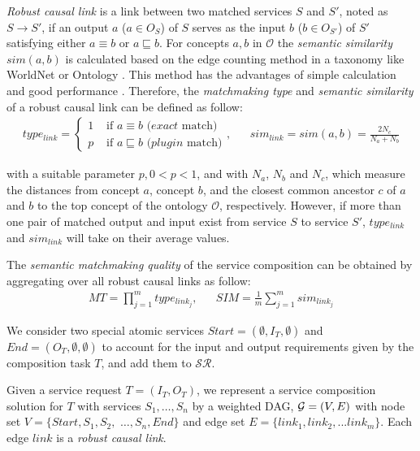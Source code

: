 \emph{Robust causal link} \cite{lecue2008optimizing} is a link between two matched services $S$ and $S'$, noted as $S \rightarrow S'$, if an output $a$ ($a \in {O_S}$) of $S$ serves as the input $b$ ($b \in {O_{S'}}$) of $S'$ satisfying either $a \equiv b$ or $a \sqsubseteq b$.  For concepts $a, b$ in $\mathcal{O}$ the \emph{semantic similarity} $sim(a, b)$ is calculated based on the edge counting method in a taxonomy like WorldNet or Ontology \cite{shet2012new}. This method has the advantages of simple calculation and good performance \cite{shet2012new}. Therefore, the \emph{matchmaking type} and \emph{semantic similarity} of a robust causal link can be defined as follow:
\begin{align}
\label{eq_link}
type_{link} = 
\begin{cases}
	1 & \text{ if $a\equiv b$ ($exact$ match)}\\
	p & \text{ if $a \sqsubseteq b$ ($plugin$ match)}
\end{cases}
,&&
sim_{link} = sim(a,b) = \frac{2N_c}{N_{a}+N_{b}}
\end{align}

\noindent with a suitable parameter $p, 0<p< 1$, and with $N_a$, $N_b$ and $N_c$, which measure the distances from concept $a$, concept $b$, and the closest common ancestor $c$ of $a$ and $b$ to the top concept of the ontology $\mathcal{O}$, respectively. However, if more than one pair of matched output and input exist from service $S$ to service $S'$, $type_{link}$ and $sim_{link}$ will take on their average values.

The \emph{semantic matchmaking quality} of the service composition can be obtained by aggregating over all robust causal links as follow:
\begin{align}
MT {=} \prod_{j=1}^{m} type_ {link_{j}}
,&&
SIM {=} \frac{1}{m}\sum_{j=1}^m sim_ {link_{j}}  
\end{align}

We consider two special atomic services $Start = (\emptyset, I_T, \emptyset )$ and $End  = (O_T, \emptyset, \emptyset)$ to account for the input and output requirements given by the composition task $T$, and add them to $\mathcal{SR}$. 

Given a service request $T=(I_T,O_T)$, we represent a service composition solution for $T$ with services $S_1,\ldots,S_n$  by a weighted DAG, $\mathcal{G}=(V,E)$ with node set $V=\{Start, S_1, S_2, $ $\ldots, S_n, End\}$ and edge set $E = \{link_{1}, link_{2},... link_{m} \}$. Each edge $link$ is a \emph{robust causal link}.


